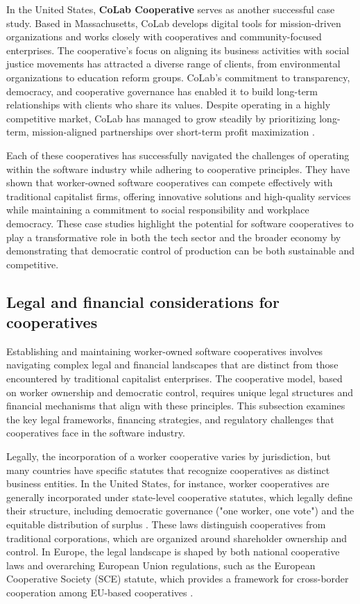 \begin{refsection}
In the United States, \textbf{CoLab Cooperative} serves as another successful case study. Based in Massachusetts, CoLab develops digital tools for mission-driven organizations and works closely with cooperatives and community-focused enterprises. The cooperative’s focus on aligning its business activities with social justice movements has attracted a diverse range of clients, from environmental organizations to education reform groups. CoLab’s commitment to transparency, democracy, and cooperative governance has enabled it to build long-term relationships with clients who share its values. Despite operating in a highly competitive market, CoLab has managed to grow steadily by prioritizing long-term, mission-aligned partnerships over short-term profit maximization \cite[pp.~199-201]{wright2010}.

Each of these cooperatives has successfully navigated the challenges of operating within the software industry while adhering to cooperative principles. They have shown that worker-owned software cooperatives can compete effectively with traditional capitalist firms, offering innovative solutions and high-quality services while maintaining a commitment to social responsibility and workplace democracy. These case studies highlight the potential for software cooperatives to play a transformative role in both the tech sector and the broader economy by demonstrating that democratic control of production can be both sustainable and competitive.

\subsection{Legal and financial considerations for cooperatives}

Establishing and maintaining worker-owned software cooperatives involves navigating complex legal and financial landscapes that are distinct from those encountered by traditional capitalist enterprises. The cooperative model, based on worker ownership and democratic control, requires unique legal structures and financial mechanisms that align with these principles. This subsection examines the key legal frameworks, financing strategies, and regulatory challenges that cooperatives face in the software industry.

Legally, the incorporation of a worker cooperative varies by jurisdiction, but many countries have specific statutes that recognize cooperatives as distinct business entities. In the United States, for instance, worker cooperatives are generally incorporated under state-level cooperative statutes, which legally define their structure, including democratic governance ("one worker, one vote") and the equitable distribution of surplus \cite[pp.~64-66]{kelly2012}. These laws distinguish cooperatives from traditional corporations, which are organized around shareholder ownership and control. In Europe, the legal landscape is shaped by both national cooperative laws and overarching European Union regulations, such as the European Cooperative Society (SCE) statute, which provides a framework for cross-border cooperation among EU-based cooperatives \cite[pp.~87-89]{fici2013}.


\end{refsection}

